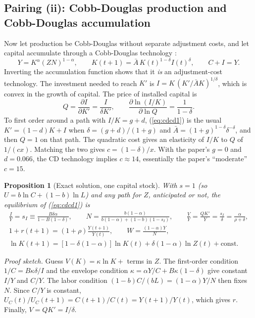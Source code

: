 \documentclass[11pt]{article}
\newtheorem{proposition}{Proposition}
\begin{document}
\begin{table}[h]\centering\small
\caption{Single capital stock, pairing (i): long-run effect of a fall in $r$ from 7.5 to 4 percent ($g=0$, $d=0.066$).}\label{tab:cesr}

\end{table}

\subsection{Pairing (ii): Cobb-Douglas production and Cobb-Douglas accumulation}

Now let production be Cobb-Douglas without separate adjustment costs, and let capital
accumulate through a Cobb-Douglas technology
\citep{lucasprescott1971,hercowitzsampson1991}:
\begin{equation}
Y=K^{\alpha}(ZN)^{1-\alpha},\qquad K(t+1)=\bar A\,K(t)^{1-\delta}I(t)^{\delta},\qquad C+I=Y.
\label{eq:cdcd1}
\end{equation}
Inverting the accumulation function shows that it \emph{is} an adjustment-cost
technology. The investment needed to reach $K'$ is $I=K\,(K'/\bar AK)^{1/\delta}$, which is
convex in the growth of capital. The price of installed capital is
\begin{equation*}
Q=\frac{\partial I}{\partial K'}=\frac{I}{\delta K'},\qquad
\frac{\partial\ln(I/K)}{\partial\ln Q}=\frac1{1-\delta}.
\end{equation*}
To first order around a path with $I/K=g+d$, (\ref{eq:cdcd1}) is the usual
$K'=(1-d)K+I$ when $\delta=(g+d)/(1+g)$ and $\bar A=(1+g)^{1-\delta}\delta^{-\delta}$, and then $Q=1$
on that path. The quadratic cost gives an elasticity of $I/K$ to $Q$ of $1/(cx)$. Matching
the two gives $c=(1-\delta)/x$. With the paper's $g=0$ and $d=0.066$, the CD technology
implies $c\approx14$, essentially the paper's ``moderate'' $c=15$.

\begin{proposition}[Exact solution, one capital stock]\label{prop:cdcd1}
With $s=1$ (so $U=b\ln C+(1-b)\ln L$) and any path for $Z$, anticipated or not, the
equilibrium of (\ref{eq:cdcd1}) is
\begin{gather*}
\frac IY=s_I\equiv\frac{B\delta\alpha}{1-B(1-\delta)},\qquad
N=\frac{b(1-\alpha)}{b(1-\alpha)+(1-b)(1-s_I)},\qquad
\frac VY=\frac{QK'}{Y}=\frac{s_I}{\delta}=\frac{\alpha}{\rho+\delta},\\
1+r(t+1)=(1+\rho)\frac{Y(t+1)}{Y(t)},\qquad W=\frac{(1-\alpha)Y}{N},\\
\ln K(t+1)=[1-\delta(1-\alpha)]\ln K(t)+\delta(1-\alpha)\ln Z(t)+\text{const}.
\end{gather*}
\end{proposition}
\emph{Proof sketch.} Guess $V(K)=\kappa\ln K+$ terms in $Z$. The first-order condition
$1/C=B\kappa\delta/I$ and the envelope condition $\kappa=\alpha Y/C+B\kappa(1-\delta)$
give constant $I/Y$ and $C/Y$. The labor condition $(1-b)C/(bL)=(1-\alpha)Y/N$ then fixes
$N$. Since $C/Y$ is constant, $U_C(t)/U_C(t+1)=C(t+1)/C(t)=Y(t+1)/Y(t)$, which gives $r$.
Finally, $V=QK'=I/\delta$.
\end{document}
